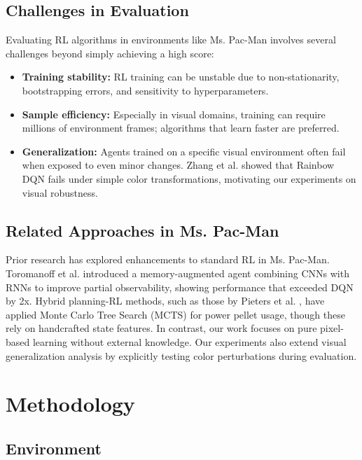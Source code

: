 \documentclass{article}
\begin{document}
\subsection{Challenges in Evaluation}

Evaluating RL algorithms in environments like Ms. Pac-Man involves several challenges beyond simply achieving a high score:
\begin{itemize}
    \item \textbf{Training stability:} RL training can be unstable due to non-stationarity, bootstrapping errors, and sensitivity to hyperparameters.
    \item \textbf{Sample efficiency:} Especially in visual domains, training can require millions of environment frames; algorithms that learn faster are preferred.
    \item \textbf{Generalization:} Agents trained on a specific visual environment often fail when exposed to even minor changes. Zhang et al. \cite{zhang2020investigation} showed that Rainbow DQN fails under simple color transformations, motivating our experiments on visual robustness.
\end{itemize}

\subsection{Related Approaches in Ms. Pac-Man}

Prior research has explored enhancements to standard RL in Ms. Pac-Man. Toromanoff et al. \cite{toromanoff2019deep} introduced a memory-augmented agent combining CNNs with RNNs to improve partial observability, showing performance that exceeded DQN by 2x. Hybrid planning-RL methods, such as those by Pieters et al. \cite{pieters2016monte}, have applied Monte Carlo Tree Search (MCTS) for power pellet usage, though these rely on handcrafted state features. In contrast, our work focuses on pure pixel-based learning without external knowledge. Our experiments also extend visual generalization analysis by explicitly testing color perturbations during evaluation.

\section{Methodology}

\subsection{Environment}
\end{document}

